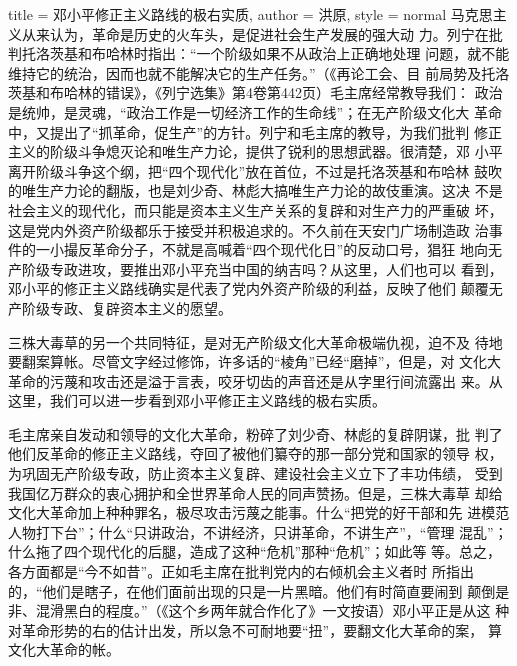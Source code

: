 \begin{hongqiarticle}{
        title  = {邓小平修正主义路线的极右实质},
        author = {洪原},
        style  = normal
    }
    马克思主义从来认为，革命是历史的火车头，是促进社会生产发展的强大动
    力。列宁在批判托洛茨基和布哈林时指出：“一个阶级如果不从政治上正确地处理
    问题，就不能维持它的统治，因而也就不能解决它的生产任务。”（《再论工会、目
    前局势及托洛茨基和布哈林的错误》，《列宁选集》第4卷第442页）毛主席经常教导我们：
    政治是统帅，是灵魂，“政治工作是一切经济工作的生命线”；在无产阶级文化大
    革命中，又提出了“抓革命，促生产”的方针。列宁和毛主席的教导，为我们批判
    修正主义的阶级斗争熄灭论和唯生产力论，提供了锐利的思想武器。很清楚，邓
    小平离开阶级斗争这个纲，把“四个现代化”放在首位，不过是托洛茨基和布哈林
    鼓吹的唯生产力论的翻版，也是刘少奇、林彪大搞唯生产力论的故伎重演。这决
    不是社会主义的现代化，而只能是资本主义生产关系的复辟和对生产力的严重破
    坏，这是党内外资产阶级都乐于接受并积极追求的。不久前在天安门广场制造政
    治事件的一小撮反革命分子，不就是高喊着“四个现代化日”的反动口号，猖狂
    地向无产阶级专政进攻，要推出邓小平充当中国的纳吉吗？从这里，人们也可以
    看到，邓小平的修正主义路线确实是代表了党内外资产阶级的利益，反映了他们
    颠覆无产阶级专政、复辟资本主义的愿望。

    三株大毒草的另一个共同特征，是对无产阶级文化大革命极端仇视，迫不及
    待地要翻案算帐。尽管文字经过修饰，许多话的“棱角”已经“磨掉”，但是，对
    文化大革命的污蔑和攻击还是溢于言表，咬牙切齿的声音还是从字里行间流露出
    来。从这里，我们可以进一步看到邓小平修正主义路线的极右实质。

    毛主席亲自发动和领导的文化大革命，粉碎了刘少奇、林彪的复辟阴谋，批
    判了他们反革命的修正主义路线，夺回了被他们纂夺的那一部分党和国家的领导
    权，为巩固无产阶级专政，防止资本主义复辟、建设社会主义立下了丰功伟绩，
    受到我国亿万群众的衷心拥护和全世界革命人民的同声赞扬。但是，三株大毒草
    却给文化大革命加上种种罪名，极尽攻击污蔑之能事。什么“把党的好干部和先
    进模范人物打下台”；什么“只讲政治，不讲经济，只讲革命，不讲生产”，“管理
    混乱”；什么拖了四个现代化的后腿，造成了这种“危机”那种“危机”；如此等
    等。总之，各方面都是“今不如昔”。正如毛主席在批判党内的右倾机会主义者时
    所指出的，“他们是瞎子，在他们面前出现的只是一片黑暗。他们有时简直要闹到
    颠倒是非、混滑黑白的程度。”（《这个乡两年就合作化了》一文按语）邓小平正是从这
    种对革命形势的右的估计出发，所以急不可耐地要“扭”，要翻文化大革命的案，
    算文化大革命的帐。


\end{hongqiarticle}

